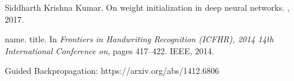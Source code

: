 \documentclass{article}
\begin{document}
\begin{thebibliography}{1}

Siddharth Krishna Kumar.
\newblock On weight initialization in deep neural networks.
, 2017.

name.
\newblock title.
\newblock In {\em Frontiers in Handwriting Recognition (ICFHR), 2014 14th
  International Conference on}, pages 417--422. IEEE, 2014.

Guided Backpropagation: https://arxiv.org/abs/1412.6806

\end{thebibliography}
\end{document}
